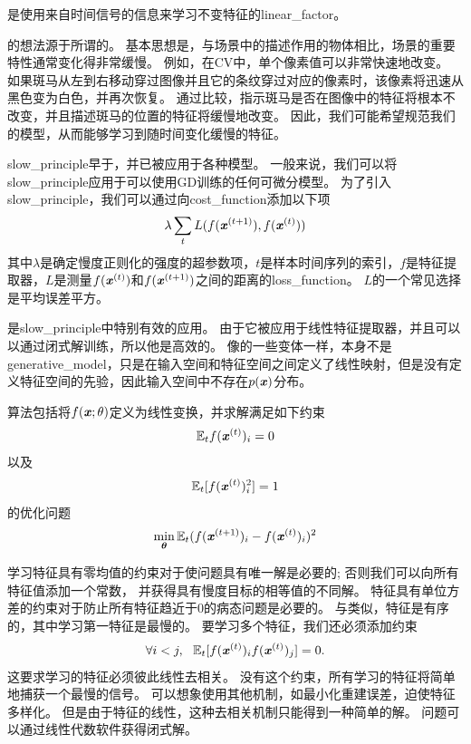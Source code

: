 是使用来自时间信号的信息来学习不变特征的\gls{linear_factor}\citep{WisSej2002}。


的想法源于所谓的。
基本思想是，与场景中的描述作用的物体相比，场景的重要特性通常变化得非常缓慢。
例如，在\gls{CV}中，单个像素值可以非常快速地改变。
如果斑马从左到右移动穿过图像并且它的条纹穿过对应的像素时，该像素将迅速从黑色变为白色，并再次恢复。
通过比较，指示斑马是否在图像中的特征将根本不改变，并且描述斑马的位置的特征将缓慢地改变。
因此，我们可能希望规范我们的模型，从而能够学习到随时间变化缓慢的特征。


\gls{slow_principle}早于，并已被应用于各种模型\citep{Hinton89b,Foldiak89,MobahiCollobertWestonICML2009,Bergstra+Bengio-2009}。
一般来说，我们可以将\gls{slow_principle}应用于可以使用\gls{GD}训练的任何可微分模型。 
为了引入\gls{slow_principle}，我们可以通过向\gls{cost_function}添加以下项
\begin{align}
\label{eqn:137}
\lambda \sum_t 
L(f(\boldsymbol{\mathit{x}}^{(t+1)}),f(\boldsymbol{\mathit{x}}^{(t)}))
\end{align}
其中$\lambda$是确定慢度正则化的强度的超参数项，$t$是样本时间序列的索引，$f$是特征提取器，$L$是测量$f(\boldsymbol{\mathit{x}}^{(t)})$和$f(\boldsymbol{\mathit{x}}^{(t+1)})$之间的距离的\gls{loss_function}。
$L$的一个常见选择是平均误差平方。


是\gls{slow_principle}中特别有效的应用。
由于它被应用于线性特征提取器，并且可以以通过闭式解训练，所以他是高效的。
像的一些变体一样，本身不是\gls{generative_model}，只是在输入空间和特征空间之间定义了线性映射，但是没有定义特征空间的先验，因此输入空间中不存在$p(\boldsymbol{\mathit{x}})$分布。


算法\citep{WisSej2002}包括将$f(\boldsymbol{\mathit{x}};\theta)$定义为线性变换，并求解满足如下约束
\begin{align}
\label{eqn:139}
\mathbb{E}_t  f(\boldsymbol{\mathit{x}}^{(t)})_i = 0 
\end{align}
以及
\begin{align}
\label{eqn:1310}
\mathbb{E}_t [ f(\boldsymbol{\mathit{x}}^{(t)})_i^2 ] =1 
\end{align}
的优化问题
\begin{align}
\label{eqn:138}
\min_{\boldsymbol{\theta}} \mathbb{E}_t  (f(\boldsymbol{\mathit{x}}^{(t+1)})_i - f(\boldsymbol{\mathit{x}}^{(t)})_i  )^2
\end{align}


学习特征具有零均值的约束对于使问题具有唯一解是必要的; 否则我们可以向所有特征值添加一个常数，
并获得具有慢度目标的相等值的不同解。
特征具有单位方差的约束对于防止所有特征趋近于0的病态问题是必要的。
与类似，特征是有序的，其中学习第一特征是最慢的。
要学习多个特征，我们还必须添加约束
\begin{align}
\label{eqn:1311}
\forall i<j,\ \  \mathbb{E}_t [f(\boldsymbol{\mathit{x}}^{(t)})_i  f(\boldsymbol{\mathit{x}}^{(t)})_j] = 0.
\end{align}
这要求学习的特征必须彼此线性去相关。 
没有这个约束，所有学习的特征将简单地捕获一个最慢的信号。
可以想象使用其他机制，如最小化重建误差，迫使特征多样化。
但是由于特征的线性，这种去相关机制只能得到一种简单的解。 
问题可以通过线性代数软件获得闭式解。



